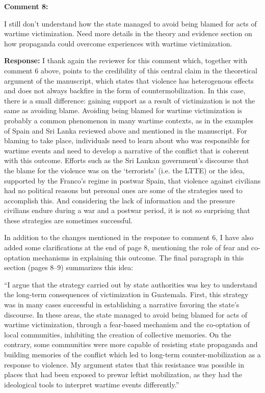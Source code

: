 \documentclass[12pt, a4paper, notitlepage]{article}
\begin{document}
\vspace{15pt}
\noindent\textbf{Comment 8:}
\begin{displayquote}
I still don't understand how the state managed to avoid being blamed for acts of wartime victimization. Need more details in the theory and evidence section on how propaganda could overcome experiences with wartime victimization.
\end{displayquote}

\noindent\textbf{Response:} I thank again the reviewer for this comment which, together with comment 6 above, points to the credibility of this central claim in the theoretical argument of the manuscript, which states that violence has heterogenous effects and does not always backfire in the form of countermobilization.
In this case, there is a small difference: gaining support as a result of victimization is not the same as avoiding blame. Avoiding being blamed for wartime victimization is probably a common phenomenon in many wartime contexts, as in the examples of Spain and Sri Lanka reviewed above and mentioned in the manuscript. For blaming to take place, individuals need to learn about who was responsible for wartime events and need to develop a narrative of the conflict that is coherent with this outcome. Efforts such as the Sri Lankan government's discourse that the blame for the violence was on the `terrorists' (i.e. the LTTE) or the idea, supported by the Franco's regime in postwar Spain, that violence against civilians had no political reasons but personal ones are some of the strategies used to accomplish this.
And considering the lack of information and the pressure civilians endure during a war and a postwar period, it is not so surprising that these strategies are sometimes successful.

In addition to the changes mentioned in the response to comment 6, I have also added some clarifications at the end of page 8, mentioning the role of fear and co-optation mechanisms in explaining this outcome. The final paragraph in this section (pages 8--9) summarizes this idea:

``I argue that the strategy carried out by state authorities was key to understand the long-term consequences of victimization in Guatemala.
First, this strategy was in many cases successful in establishing a narrative favoring the state's discourse.
In these areas, the state managed to avoid being blamed for acts of wartime victimization, through a fear-based mechanism and the co-optation of local communities, inhibiting the creation of collective memories.
On the contrary, some communities were more capable of resisting state propaganda and building memories of the conflict which led to long-term counter-mobilization as a response to violence.
My argument states that this resistance was possible in places that had been exposed to prewar leftist mobilization, as they had the ideological tools to interpret wartime events differently.''
\end{document}
